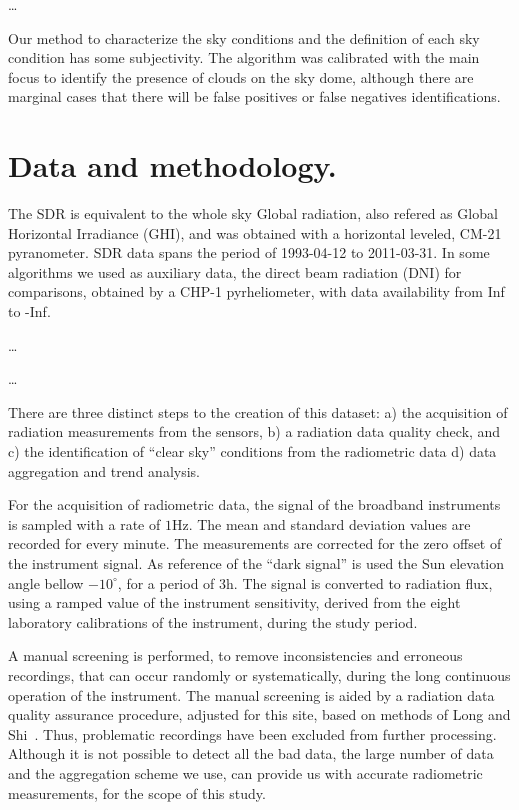 \documentclass[preprint, 3p,
authoryear]{elsarticle} %
\begin{document}
\ldots{}

Our method to characterize the sky conditions and the definition of each
sky condition has some subjectivity. The algorithm was calibrated with
the main focus to identify the presence of clouds on the sky dome,
although there are marginal cases that there will be false positives or
false negatives identifications.

\hypertarget{data-and-methodology.}{%
\section{Data and methodology.}\label{data-and-methodology.}}

The SDR is equivalent to the whole sky Global radiation, also refered as
Global Horizontal Irradiance (GHI), and was obtained with a horizontal
leveled, CM-21 pyranometer. SDR data spans the period of 1993-04-12 to
2011-03-31. In some algorithms we used as auxiliary data, the direct
beam radiation (DNI) for comparisons, obtained by a CHP-1 pyrheliometer,
with data availability from Inf to -Inf.

\ldots{}

\ldots{}

There are three distinct steps to the creation of this dataset: a) the
acquisition of radiation measurements from the sensors, b) a radiation
data quality check, and c) the identification of ``clear sky''
conditions from the radiometric data d) data aggregation and trend
analysis.

For the acquisition of radiometric data, the signal of the broadband
instruments is sampled with a rate of \(1 \text{Hz}\). The mean and
standard deviation values are recorded for every minute. The
measurements are corrected for the zero offset of the instrument signal.
As reference of the ``dark signal'' is used the Sun elevation angle
bellow \(-10^\circ\), for a period of \(3 \text{h}\). The signal is
converted to radiation flux, using a ramped value of the instrument
sensitivity, derived from the eight laboratory calibrations of the
instrument, during the study period.

A manual screening is performed, to remove inconsistencies and erroneous
recordings, that can occur randomly or systematically, during the long
continuous operation of the instrument. The manual screening is aided by
a radiation data quality assurance procedure, adjusted for this site,
based on methods of Long and
Shi~\citetext{\citeyear{long_automated_2008}; \citeyear{Long2006}}.
Thus, problematic recordings have been excluded from further processing.
Although it is not possible to detect all the bad data, the large number
of data and the aggregation scheme we use, can provide us with accurate
radiometric measurements, for the scope of this study.
\end{document}
